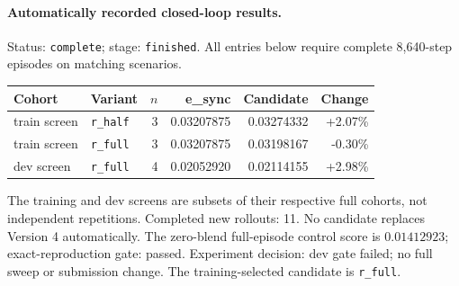 \paragraph{Automatically recorded closed-loop results.}
Status: \texttt{complete}; stage: \texttt{finished}.
All entries below require complete 8,640-step episodes on matching scenarios.
\begin{center}\small
\begin{tabular}{llrrrr}\toprule
Cohort & Variant & $n$ & e\_sync & Candidate & Change \\\midrule
train screen & \texttt{r\_half} & 3 & 0.03207875 & 0.03274332 & +2.07\% \\
train screen & \texttt{r\_full} & 3 & 0.03207875 & 0.03198167 & -0.30\% \\
dev screen & \texttt{r\_full} & 4 & 0.02052920 & 0.02114155 & +2.98\% \\
\bottomrule\end{tabular}\end{center}
The training and dev screens are subsets of their respective full cohorts, not independent repetitions.
Completed new rollouts: 11. No candidate replaces Version 4 automatically.
The zero-blend full-episode control score is $0.01412923$; exact-reproduction gate: passed.
Experiment decision: dev gate failed; no full sweep or submission change.
The training-selected candidate is \texttt{r\_full}.
